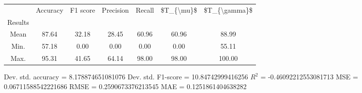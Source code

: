 \begin{tabular}{|c|c|c|c|c|c|c|}
\toprule
{} &  Accuracy &  F1 score &  Precision &  Recall &  \$T\_\{\textbackslash mu\}\$ &  \$T\_\{\textbackslash gamma\}\$ \\
Results &           &           &            &         &            &               \\
\hline
Mean    &     87.64 &     32.18 &      28.45 &   60.96 &      60.96 &         88.99 \\
Min.    &     57.18 &      0.00 &       0.00 &    0.00 &       0.00 &         55.11 \\
Max.    &     95.31 &     41.65 &      64.14 &   98.00 &      98.00 &        100.00 \\
\bottomrule
\end{tabular}

 Dev. std. accuracy = 8.178874651081076
 Dev. std. F1-score = 10.84742999416256
 $R^2$ = -0.46092212553081713
 MSE = 0.06711588542221686
 RMSE = 0.2590673376213545
 MAE = 0.1251861404638282